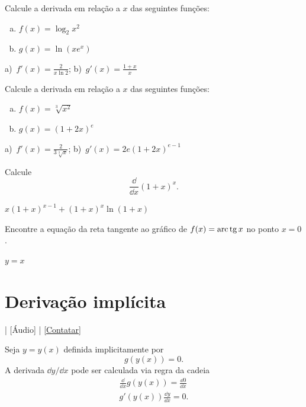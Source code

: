 \begin{exer}
  Calcule a derivada em relação a $x$ das seguintes funções:
  \begin{enumerate}[a)]
  \item $f(x) = \log_2 x^2$
  \item $g(x) = \ln (xe^x)$
  \end{enumerate}
\end{exer}
\begin{resp}
  a)~$\displaystyle f'(x) = \frac{2}{x\ln 2}$; b)~$g'(x) = \frac{1+x}{x}$
\end{resp}

\begin{exer}
  Calcule a derivada em relação a $x$ das seguintes funções:
  \begin{enumerate}[a)]
  \item $f(x) = \sqrt[3]{x^2}$
  \item $g(x) = (1+2x)^e$
  \end{enumerate}
\end{exer}
\begin{resp}
  a)~$\displaystyle f'(x) = \frac{2}{3\sqrt[3]{x}}$; b)~$g'(x) = 2e(1+2x)^{e-1}$
\end{resp}

\begin{exer}
  Calcule
  \begin{equation}
    \frac{\dd}{\dd x} (1+x)^x.
  \end{equation}
\end{exer}
\begin{resp}
  $x(1+x)^{x-1} + (1+x)^x\ln(1+x)$
\end{resp}

\begin{exer}
  Encontre a equação da reta tangente ao gráfico de $f(x) = \operatorname{arc}\operatorname{tg} x$ no ponto $x=0$.
\end{exer}
\begin{resp}
  $y=x$
\end{resp}

\section{Derivação implícita}\label{cap_deriv_sec_derimp}

\begin{flushright}
  [Vídeo] | [Áudio] | \href{https://phkonzen.github.io/notas/contato.html}{[Contatar]}
\end{flushright}

Seja $y = y(x)$ definida implicitamente por
\begin{equation}
  g(y(x)) = 0.
\end{equation}
A derivada $\dd y/\dd x$ pode ser calculada via regra da cadeia
\begin{gather}
  \frac{\dd}{\dd x}g(y(x)) = \frac{\dd 0}{\dd x} \\
  g'(y(x))\frac{\dd y}{\dd x} = 0.
\end{gather}

